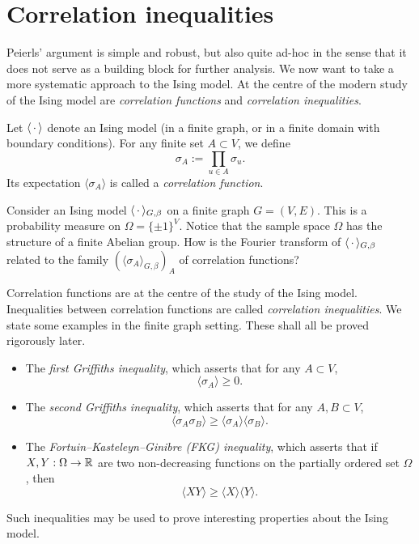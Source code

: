 \section{Correlation inequalities}
\label{sec:correlation}

Peierls' argument is simple and robust, but also quite ad-hoc in the sense
that it does not serve as a building block for further analysis.
We now want to take a more systematic approach to the Ising model.
At the centre of the modern study of the Ising model are \emph{correlation functions}
and \emph{correlation inequalities}.

Let $\langle\,\cdot\,\rangle$ denote an Ising model (in a finite graph,
or in a finite domain with boundary conditions).
For any finite set $A\subset V$, we define
\[
    \sigma_{A}:=\prod_{u\in A}\sigma_u.
\]
Its expectation $\langle\sigma_A\rangle$ is called a \emph{correlation function}.

\begin{exercise}
    Consider an Ising model $\langle\,\cdot\,\rangle_{G,\beta}$
    on a finite graph $G=(V,E)$.
    This is a probability measure on $\Omega=\{\pm1\}^V$.
    Notice that the sample space $\Omega$ has the structure of a finite Abelian group.
    How is the Fourier transform of $\langle\,\cdot\,\rangle_{G,\beta}$ related
    to the family $(\langle\sigma_A\rangle_{G,\beta})_A$ of correlation functions?
\end{exercise}

Correlation functions are at the centre of the study of the Ising model.
Inequalities between correlation functions are called \emph{correlation inequalities}.
We state some examples in the finite graph setting.
These shall all be proved rigorously later.
\begin{itemize}
    \item The \emph{first Griffiths inequality}, which asserts that for any $A\subset V$,
        \[
            \langle\sigma_A\rangle\geq 0.
        \]
    \item The \emph{second Griffiths inequality}, which asserts that for any $A,B\subset V$,
    \[
        \langle\sigma_A\sigma_B\rangle
        \geq
        \langle\sigma_A\rangle\langle\sigma_B\rangle.
    \]
    \item The \emph{Fortuin--Kasteleyn--Ginibre (FKG) inequality}, which asserts that
    if $X,Y:\Omega\to\mathbb R$ are two non-decreasing functions on the partially ordered set $\Omega$,
    then
    \[
        \langle XY\rangle
        \geq
        \langle X\rangle\langle Y\rangle.
    \]    
\end{itemize}
Such inequalities may be used to prove interesting properties about the Ising model.

